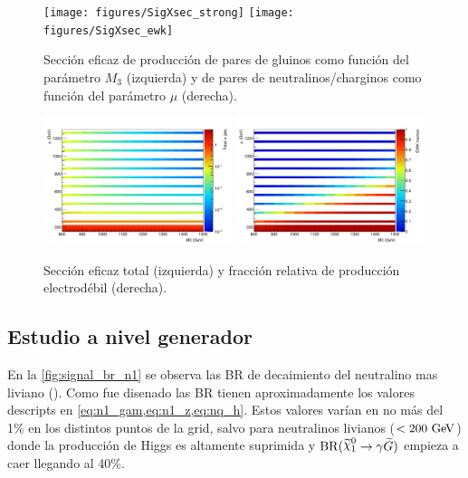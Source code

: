 \begin{figure}[htbp]
  \centering
  \texttt{[image: figures/SigXsec\_strong]}
  \texttt{[image: figures/SigXsec\_ewk]}

  \caption{Sección eficaz de producción de pares de gluinos como función del parámetro $M_3$ (izquierda)
    y de pares de neutralinos/charginos como función del parámetro $\mu$ (derecha).}
  \label{fig:signal_xs}
\end{figure}

\begin{figure}[ht!]
  \centering
  \includegraphics[width=0.49\textwidth]{figures/SigXsec_total}
  \includegraphics[width=0.49\textwidth]{figures/SigXsec_ewkFrac}
  \caption{Sección eficaz total (izquierda) y fracción relativa
    de producción electrodébil (derecha).}
  \label{fig:signal_xs_total}
\end{figure}



\subsection{Estudio a nivel generador}

En la \cref{fig:signal_br_n1} se observa las BR de decaimiento del
neutralino mas liviano (\ninoone). Como fue disenado las BR tienen aproximadamente
los valores descripts en \cref{eq:n1_gam,eq:n1_z,eq:nq_h}.
Estos valores varían en no más del 1\% en los distintos puntos de la grid, salvo para neutralinos
livianos ($<200\gev$) donde la producción de Higgs es altamente suprimida y
$\mathrm{BR}(\ninoone \to \gam \gravino)$ empieza a caer llegando al 40\%.

